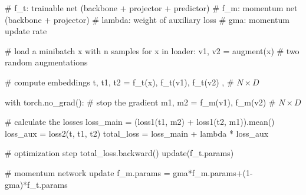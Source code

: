 \begin{algorithm}[!htbp]
\caption{Representation learning with RLPL} \label{alg:bywl}
\begin{algorithmic}
\State \textcolor{pythoncomment}{\# f\_t: trainable net (backbone + projector + predictor)}
\State \textcolor{pythoncomment}{\# f\_m: momentum net (backbone + projector)}
\State \textcolor{pythoncomment}{\# lambda: weight of auxiliary loss}
\State \textcolor{pythoncomment}{\# gma: momentum update rate}

\State \text{}
\State \textcolor{pythoncomment}{\# load a minibatch x with n samples}
\State  \textcolor{pythonfunction}{for} x \textcolor{pythonfunction}{in} loader:
\State \hspace{1.1em} v1, v2 = augment(x) \textcolor{pythoncomment}{\# two random augmentations}

\State \text{}
\State \hspace{1.1em} \textcolor{pythoncomment}{\# compute embeddings}
\State \hspace{1.1em}	t, t1, t2 = f\_t(x), f\_t(v1), f\_t(v2)  , \textcolor{pythoncomment}{\# $N \times D$}

\State \text{}
\State \hspace{1.1em}	\textcolor{purpleish}{with} torch.no\_grad(): \textcolor{pythoncomment}{\# stop the gradient}
\State \hspace{2.5em}	m1, m2 = f\_m(v1), f\_m(v2) \textcolor{pythoncomment} {\# $N \times D$}

\State \text{}
\State \hspace{1.1em} \textcolor{pythoncomment}{\# calculate the losses}
\State \hspace{1.1em}	loss\_main = (loss1(t1, m2) + loss1(t2, m1)).mean()
\State \hspace{1.1em} loss\_aux = loss2(t, t1, t2)
\State \hspace{1.1em}	total\_loss = loss\_main + lambda * loss\_aux

\State \text{}
\State \hspace{1.1em} \textcolor{pythoncomment}{\# optimization step}
\State \hspace{1.1em} total\_loss.backward() 
\State \hspace{1.1em} update(f\_t.params)

\State \text{}
\State \hspace{1.1em} \textcolor{pythoncomment}{\# momentum network update}
\State \hspace{1.1em} f\_m.params = gma*f\_m.params+(1-gma)*f\_t.params


\end{algorithmic}
\end{algorithm}
